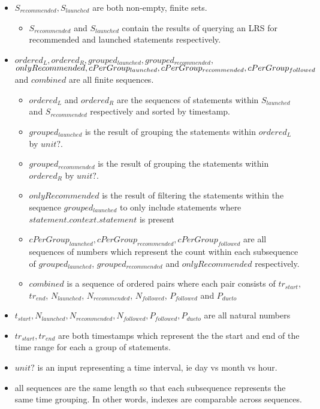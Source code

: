 \documentclass{article}
\begin{document}
\begin{itemize}
\item $S_{recommended}, S_{launched}$ are both non-empty, finite sets.
  \begin{itemize}
  \item $S_{recommended}$ and $S_{launched}$ contain
    the results of querying an LRS for recommended and launched
    statements respectively.
  \end{itemize}
\item $ordered_{L}, ordered_{R}, grouped_{launched},
  grouped_{recommended},$ $onlyRecommended, \\ cPerGroup_{launched},
  cPerGroup_{recommended}, cPerGroup_{followed}$ and $combined$ are
  all finite sequences.
  \begin{itemize}
    \item $ordered_{L}$ and $ordered_{R}$ are the sequences of
      statements within $S_{launched}$ and $S_{recommended}$
      respectively and sorted by timestamp.
    \item $grouped_{launched}$ is the result of grouping the
      statements within $ordered_{L}$ by $unit?$.
    \item $grouped_{recommended}$ is the result of grouping the
      statements within $ordered_{R}$ by $unit?$.
    \item $onlyRecommended$ is the result of filtering the statements
      within the sequence $grouped_{launched}$ to only include
      statements where $statement.context.statement$ is present
    \item $cPerGroup_{launched}, cPerGroup_{recommended},
      cPerGroup_{followed}$ are all sequences of numbers which
      represent the count within each subsequence of
      $grouped_{launched}$, $grouped_{recommended}$ and
      $onlyRecommended$ respectively.
    \item $combined$ is a sequence of ordered pairs where each pair
      consists of $tr_{start}$, $tr_{end}$, $N_{launched}$,
      $N_{recommended}$, $N_{followed}$, $P_{followed}$ and $P_{dueto}$
    \end{itemize}
\item $t_{start}, N_{launched}, N_{recommended}, N_{followed},
  P_{followed}, P_{dueto}$ are all natural numbers
\item $tr_{start}, tr_{end}$ are both timestamps which represent the
  the start and end of the time range for each a group of statements.
\item $unit?$ is an input representing a time interval, ie day vs
  month vs hour.
\item all sequences are the same length so that each subsequence
  represents the same time grouping. In other words, indexes are
  comparable across sequences.
\end{itemize}
\end{document}
